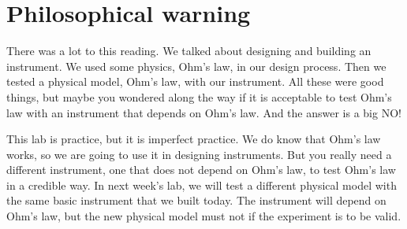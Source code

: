 \section{Philosophical warning}

There was a lot to this reading. We talked about designing and building an
instrument. We used some physics, Ohm's law, in our design process. Then we
tested a physical model, Ohm's law, with our instrument. All these were good
things, but maybe you wondered along the way if it is acceptable to test
Ohm's law with an instrument that depends on Ohm's law. And the answer is a
big NO!

This lab is practice, but it is imperfect practice. We do know that Ohm's
law works, so we are going to use it in designing instruments. But you
really need a different instrument, one that does not depend on Ohm's law,
to test Ohm's law in a credible way. In next week's lab, we will test a
different physical model with the same basic instrument that we built today.
The instrument will depend on Ohm's law, but the new physical model must not
if the experiment is to be valid.
\vfill

